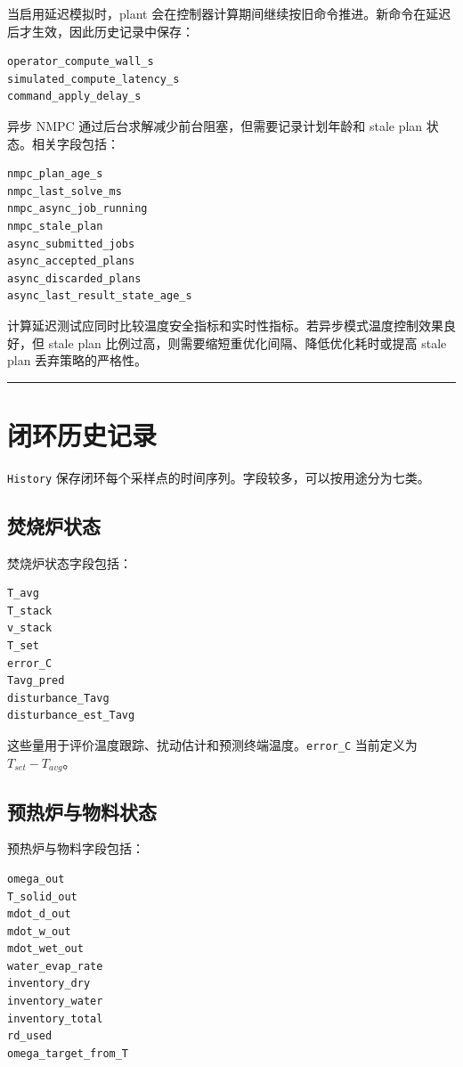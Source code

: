 \documentclass[UTF8,openany,zihao=-4,oneside]{ctexbook}
\providecommand{\passthrough}[1]{#1}
\newcommand{\manualdivider}{\par\vspace{0.6em}\noindent\textcolor{FGLine}{\rule{\linewidth}{0.7pt}}\vspace{0.6em}\par}
\begin{document}
当启用延迟模拟时，plant 会在控制器计算期间继续按旧命令推进。新命令在延迟后才生效，因此历史记录中保存：

\begin{lstlisting}
operator_compute_wall_s
simulated_compute_latency_s
command_apply_delay_s
\end{lstlisting}

异步 NMPC 通过后台求解减少前台阻塞，但需要记录计划年龄和 stale plan 状态。相关字段包括：

\begin{lstlisting}
nmpc_plan_age_s
nmpc_last_solve_ms
nmpc_async_job_running
nmpc_stale_plan
async_submitted_jobs
async_accepted_plans
async_discarded_plans
async_last_result_state_age_s
\end{lstlisting}

计算延迟测试应同时比较温度安全指标和实时性指标。若异步模式温度控制效果良好，但 stale plan 比例过高，则需要缩短重优化间隔、降低优化耗时或提高 stale plan 丢弃策略的严格性。

\manualdivider

\section{闭环历史记录}\label{sec:history-recording}

\passthrough{\lstinline!History!} 保存闭环每个采样点的时间序列。字段较多，可以按用途分为七类。

\subsection{焚烧炉状态}\label{subsec:history-furnace}

焚烧炉状态字段包括：

\begin{lstlisting}
T_avg
T_stack
v_stack
T_set
error_C
Tavg_pred
disturbance_Tavg
disturbance_est_Tavg
\end{lstlisting}

这些量用于评价温度跟踪、扰动估计和预测终端温度。\passthrough{\lstinline!error_C!} 当前定义为 \(T_{set}-T_{avg}\)。

\subsection{预热炉与物料状态}\label{subsec:history-preheater}

预热炉与物料字段包括：

\begin{lstlisting}
omega_out
T_solid_out
mdot_d_out
mdot_w_out
mdot_wet_out
water_evap_rate
inventory_dry
inventory_water
inventory_total
rd_used
omega_target_from_T
\end{lstlisting}
\end{document}
